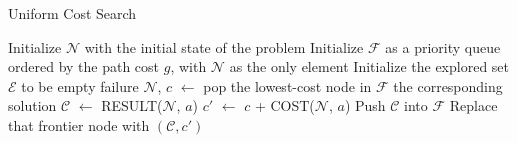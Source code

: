\documentclass[a4paper,UKenglish,cleveref, autoref, thm-restate]{qlinhta}
\begin{document}
\begin{algorithm}[H]
\caption{Uniform Cost Search}\label{alg:uniform_cost_search}
\begin{algorithmic}[1]
\State Initialize $\mathcal{N}$ with the initial state of the problem
\State Initialize $\mathcal{F}$ as a priority queue ordered by the path cost $g$, with $\mathcal{N}$ as the only element
\State Initialize the explored set $\mathcal{E}$ to be empty
        \State \Return failure
    \EndIf
    \State $\mathcal{N}$, $c$ $\gets$ pop the lowest-cost node in $\mathcal{F}$
        \State \Return the corresponding solution
    \EndIf
        \State $\mathcal{C}$ $\gets$ RESULT($\mathcal{N}$, $a$)
        \State $c'$ $\gets$ $c$ + COST($\mathcal{N}$, $a$)
            \State Push $\mathcal{C}$ into $\mathcal{F}$
            \State Replace that frontier node with $(\mathcal{C}, c')$
        \EndIf
    \EndFor
\EndWhile
\EndFunction
\end{algorithmic}
\end{algorithm}
\end{document}
